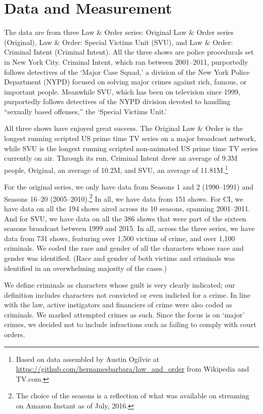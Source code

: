 \documentclass[12pt, letterpaper]{article}
\begin{document}
\section*{Data and Measurement}
The data are from three Law \& Order series: Original Law \& Order series (Original), Law \& Order: Special Victims Unit (SVU), and Law \& Order: Criminal Intent (Criminal Intent). All the three shows are police procedurals set in New York City. Criminal Intent, which ran between 2001--2011, purportedly follows detectives of the `Major Case Squad,' a division of the New York Police Department (NYPD) focused on solving major crimes against rich, famous, or important people. Meanwhile SVU, which has been on television since 1999, purportedly follows detectives of the NYPD division devoted to handling ``sexually based offenses,'' the `Special Victims Unit.'

All three shows have enjoyed great success. The Original Law \& Order is the longest running scripted US prime time TV series on a major broadcast network, while SVU is the longest running scripted non-animated US prime time TV series currently on air. Through its run, Criminal Intent drew an average of 9.3M people, Original, an average of 10.2M, and SVU, an average of 11.81M.\footnote{Based on data assembled by Austin Ogilvie at \href{https://github.com/hernamesbarbara/law_and_order}{https://github.com/hernamesbarbara/law\_and\_order} from Wikipedia and TV.com.}

For the original series, we only have data from Seasons 1 and 2 (1990--1991) and Seasons 16--20 (2005--2010).\footnote{The choice of the seasons is a reflection of what was available on streaming on Amazon Instant as of July, 2016.} In all, we have data from 151 shows. For CI, we have data on all the 194 shows aired across its 10 seasons, spanning 2001--2011. And for SVU, we have data on all the 386 shows that were part of the sixteen seasons broadcast between 1999 and 2015. In all, across the three series, we have data from 731 shows, featuring over 1,500 victims of crime, and over 1,100 criminals. We coded the race and gender of all the characters whose race and gender was identified. (Race and gender of both victims and criminals was identified in an overwhelming majority of the cases.) 

We define criminals as characters whose guilt is very clearly indicated; our definition includes characters not convicted or even indicted for a crime. In line with the law, active instigators and financiers of crime were also coded as criminals. We marked attempted crimes as such. Since the focus is on `major' crimes, we decided not to include infractions such as failing to comply with court orders. 
\end{document}
